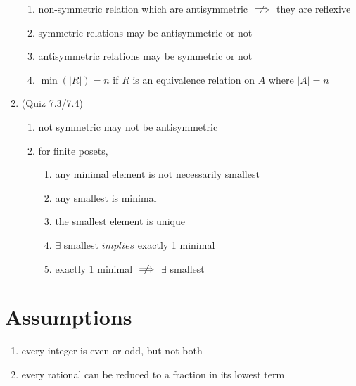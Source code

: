 \documentclass[landscape, a4paper]{article}
\newcommand{\customsection}[1]{%
    \vspace*{-16pt}%
    \section*{#1}%
    \vspace*{-5pt}%
}
\begin{document}
\begin{multicols*}{4}
\begin{enumerate}[wide, labelindent=2pt]
\begin{enumerate}
                  \item non-symmetric relation which are antisymmetric $\centernot\implies$ they are reflexive
                  \item symmetric relations may be antisymmetric or not
                  \item antisymmetric relations may be symmetric or not
                  \item $\min(|R|)=n$ if $R$ is an equivalence relation on $A$ where $|A|=n$
              \end{enumerate}
        \item (Quiz 7.3/7.4)
              \begin{enumerate}
                  \item not symmetric may not be antisymmetric
                  \item for finite posets,
                        \begin{enumerate}[wide]
                            \item any minimal element is not necessarily smallest
                            \item any smallest is minimal
                            \item the smallest element is unique
                            \item $\exists$ smallest $implies$ exactly 1 minimal
                            \item exactly 1 minimal $\centernot\implies$ $\exists$ smallest
                        \end{enumerate}
              \end{enumerate}
    \end{enumerate}

    \customsection{Assumptions}
    \begin{enumerate}[wide, labelindent=2pt]
        \item every integer is even or odd, but not both
        \item every rational can be reduced to a fraction in its lowest term
    \end{enumerate}

\end{multicols*}
\end{document}
